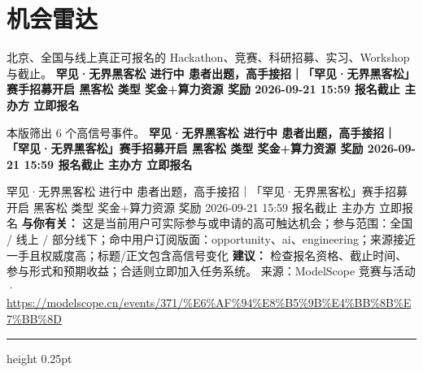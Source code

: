 \documentclass[10.5pt]{ctexart}
\begin{document}
\section*{机会雷达}
{\color{ormuted} 北京、全国与线上真正可报名的 Hackathon、竞赛、科研招募、实习、Workshop 与截止。}
\vspace{2mm}
{\LARGE\bfseries 罕见·无界黑客松 进行中 患者出题，高手接招｜「罕见·无界黑客松」赛手招募开启 黑客松 类型 奖金+算力资源 奖励 2026-09-21 15:59 报名截止 主办方 立即报名}\par
\vspace{1mm}
{\color{ormuted} 本版筛出 6 个高信号事件。}
\vspace{3mm}
{\Large\bfseries 罕见·无界黑客松 进行中 患者出题，高手接招｜「罕见·无界黑客松」赛手招募开启 黑客松 类型 奖金+算力资源 奖励 2026-09-21 15:59 报名截止 主办方 立即报名}\par
罕见·无界黑客松 进行中 患者出题，高手接招｜「罕见·无界黑客松」赛手招募开启 黑客松 类型 奖金+算力资源 奖励 2026-09-21 15:59 报名截止 主办方 立即报名
\textbf{与你有关：} 这是当前用户可实际参与或申请的高可触达机会；参与范围：全国 / 线上 / 部分线下；命中用户订阅版面：opportunity、ai、engineering；来源接近一手且权威度高；标题/正文包含高信号变化
\textbf{建议：} 检查报名资格、截止时间、参与形式和预期收益；合适则立即加入任务系统。
{\footnotesize\color{ormuted} 来源：ModelScope 竞赛与活动 · \url{https://modelscope.cn/events/371/%E6%AF%94%E8%B5%9B%E4%BB%8B%E7%BB%8D}}
\vspace{4mm}
\hrule height 0.25pt
\vspace{3mm}
\end{document}
